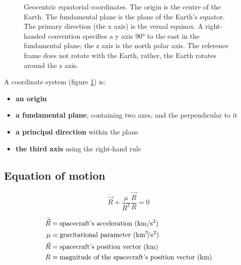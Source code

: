 \documentclass{article}
\begin{document}
\begin{figure}[!h]
	\centering
	\caption{Geocentric equatorial coordinates. The origin is the centre of the Earth. The fundamental plane is the plane of the Earth's equator. The primary direction (the x axis) is the vernal equinox. A right-handed convention specifies a y axis 90° to the east in the fundamental plane; the z axis is the north polar axis. The reference frame does not rotate with the Earth, rather, the Earth rotates around the z axis.}
	\label{fig:coordinate_system}
\end{figure}

A coordinate system (figure \ref{fig:coordinate_system}) is:
\begin{itemize}
	\item \textbf{an origin}
	\item \textbf{a fundamental plane}, containing two axes, and the perpendicular to it
	\item \textbf{a principal direction} within the plane
	\item \textbf{the third axis} using the right-hand rule
\end{itemize}

\subsection{Equation of motion}
\begin{equation*}
\boxed{\ddot{\vec{R}} + \dfrac{\mu}{R^{2}} \dfrac{\vec{R}}{R} = 0}
\end{equation*}

\begin{align*}
\ddot{\vec{R}} &= \text{spacecraft's acceleration (\si{\kilo\meter\per\second\squared})}\\
\mu &= \text{gravitational parameter (\si{\kilo\meter\cubed\per\second\squared})}\\
\vec{R} &= \text{spacecraft's position vector (\si{\kilo\meter})}\\
R &= \text{magnitude of the spacecraft's position vector (\si{\kilo\meter})}\\
\end{align*}
\end{document}
